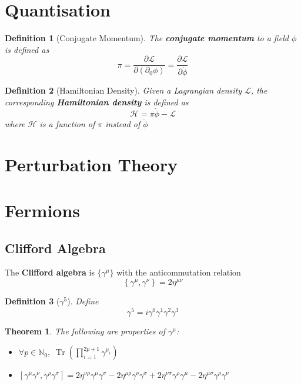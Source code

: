 \documentclass{article}
\newtheorem{theorem}{Theorem}[subsection]
\newtheorem{definition}{Definition}[subsection]
\DeclareMathOperator{\tr}{Tr}
\newcommand{\del}{\partial}
\newcommand{\bam}[1]{\textbf{#1}}
\newcommand{\mbb}[1]{\mathbb{#1}}
\newcommand{\mc}[1]{\mathcal{#1}}
\newcommand{\comm}[2][]{\left[ #1, #2 \right]} %
\newcommand{\acomm}[2][]{\left\{ #1, #2 \right\}} %
\newcommand{\pd}[2][]{\frac{\partial#1}{\partial#2}} %
\newcommand{\set}[1]{\lbrace #1 \rbrace}
\begin{document}
\section{Quantisation}

\begin{definition}[Conjugate Momentum]
The \bam{conjugate momentum} to a field $\phi$ is defined as 
\[
\pi = \pd[\mc{L}]{(\del_0\phi)} = \pd[\mc{L}]{\dot{\phi}}
\]
\end{definition}

\begin{definition}[Hamiltonian Density]
Given a Lagrangian density $\mc{L}$, the corresponding \bam{Hamiltonian density} is defined as 
\[
\mc{H}=\pi \dot{\phi}-\mc{L}
\]
where $\mc{H}$ is a function of $\pi$ instead of $\dot{\phi}$
\end{definition}
\section{Perturbation Theory}


\section{Fermions}

\subsection{Clifford Algebra}
The \bam{Clifford algebra} is $\set{ \gamma^\mu }$ with the anticommutation relation 
\[
\acomm[\gamma^\mu]{\gamma^\nu} = 2\eta^{\mu\nu}
\]

\begin{definition}[$\gamma^5$]
Define
\[
\gamma^5 = i \gamma^0 \gamma^1 \gamma^2 \gamma^3
\]
\end{definition}

\begin{theorem}
The following are properties of $\gamma^\mu$:
\begin{itemize}
    \item $\forall p\in\mbb{N}_0, \; \tr \left( \prod _ { i = 1 } ^ { 2 p + 1 } \gamma ^ { \mu _ { i } } \right)$
    \item $\comm[\gamma^\mu\gamma^\nu]{\gamma^\rho\gamma^\sigma}=2\eta^{\nu\rho}\gamma^\mu\gamma^\sigma-2\eta^{\mu\rho}\gamma^\nu\gamma^\sigma+2\eta^{\nu\sigma}\gamma^\rho\gamma^\mu-2\eta^{\mu\sigma}\gamma^\rho\gamma^\nu$
\end{itemize}
\end{theorem}
\end{document}
